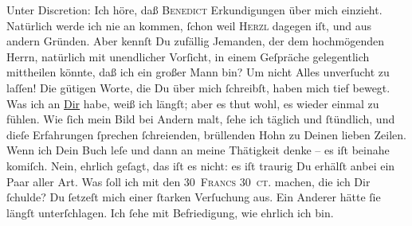 \begin{ledgroupsized}[t]{13cm}
           \pstart
           Unter Discretion: Ich höre, daß \textsc{Benedict} Erkundigungen über mich einzieht. Natürlich werde ich nie
               an \label{K_L02622-4v}\label{K_L02622-4h}
               kommen, ſchon weil \textsc{Herzl} dagegen iſt, und aus andern Gründen. Aber kennſt Du zufällig
               Jemanden, der dem hochmögenden Herrn, natürlich
               mit unendlicher Vorſicht, in einem Geſpräche gelegentlich mittheilen könnte, {\pb}daß ich ein großer Mann bin? Um nicht Alles
               unverſucht zu laſſen!\pend
           \pstart
           Die gütigen Worte, die Du über mich ſchreibſt, haben mich tief bewegt. Was ich an \uline{Dir} habe, weiß ich längſt; aber es thut wohl, es
               wieder einmal zu fühlen. Wie ſich mein Bild bei Andern malt, ſehe ich täglich und
               ſtündlich, und dieſe Erfahrungen ſprechen ſchreienden, brüllenden Hohn zu Deinen
               lieben Zeilen. Wenn ich  Dein Buch leſe und dann an meine Thätigkeit denke –
                  {\pb}es iſt beinahe komiſch. Nein, ehrlich geſagt,
               das iſt es nicht: es iſt traurig{\dotsfour}\pend
           \pstart
           Du erhälſt anbei ein Paar \label{K_L02622-11v}\label{K_L02622-11h}
               aller Art.\pend
           \pstart
           Was ſoll ich mit den \textsc{30 Francs 30 ct.} machen, die
               ich Dir ſchulde? Du ſetzeſt mich einer ſtarken Verſuchung aus. Ein Anderer hätte ſie
               längſt unterſchlagen. Ich ſehe mit Befriedigung, wie  ehrlich ich bin.\pend

\end{ledgroupsized}
